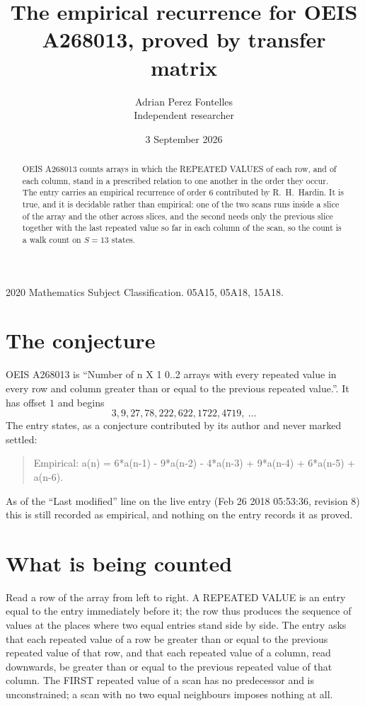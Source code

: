 \documentclass[11pt,a4paper]{article}
\title{The empirical recurrence for OEIS A268013, proved by transfer matrix}
\author{Adrian Perez Fontelles\\ \small Independent researcher}
\date{3 September 2026}
\theoremstyle{plain}
\theoremstyle{definition}
\begin{document}
\maketitle

\begin{abstract}
OEIS A268013 counts arrays in which the REPEATED VALUES of each row, and of each column, stand in a
prescribed relation to one another in the order they occur. The entry carries an empirical
recurrence of order $6$ contributed by R.~H.~Hardin. It is true, and it is decidable
rather than empirical: one of the two scans runs inside a slice of the array and the other
across slices, and the second needs only the previous slice together with the last repeated
value so far in each column of the scan, so the count is a walk count on $S=13$ states.
\end{abstract}

\noindent\small 2020 Mathematics Subject Classification. 05A15, 05A18, 15A18.\normalsize

\section{The conjecture}

OEIS A268013 is ``Number of n X 1 0..2 arrays with every repeated value in every row and column greater than or equal to the previous repeated value.''. It has offset $1$ and begins
\[
3, 9, 27, 78, 222, 622, 1722, 4719,\ \dots
\]
The entry states, as a conjecture contributed by its author and never marked settled:
\begin{quote}
Empirical: a(n) = 6*a(n-1) - 9*a(n-2) - 4*a(n-3) + 9*a(n-4) + 6*a(n-5) + a(n-6).
\end{quote}
As of the ``Last modified'' line on the live entry (Feb 26 2018 05:53:36, revision 8) this is still
recorded as empirical, and nothing on the entry records it as proved.

\section{What is being counted}

Read a row of the array from left to right. A REPEATED VALUE is an entry equal to the entry
immediately before it; the row thus produces the sequence of values at the places where two
equal entries stand side by side. The entry asks that each repeated value of a row be
greater than or equal to the previous repeated value of that row, and that each repeated value of a column,
read downwards, be greater than or equal to the previous repeated value of that column. The FIRST repeated
value of a scan has no predecessor and is unconstrained; a scan with no two equal neighbours
imposes nothing at all.
\end{document}
